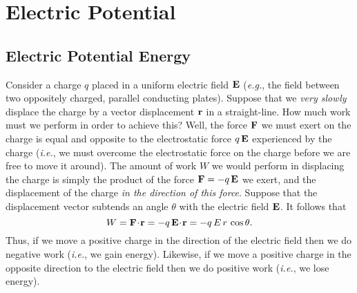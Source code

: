 \section{Electric Potential}\label{spotn}
\subsection{Electric Potential Energy}\label{s3.1}
Consider a charge $q$ placed in a uniform electric field
${\bf E}$ ({\em e.g.}, the field between two oppositely charged, parallel
conducting plates). Suppose that we {\em very slowly}\/ displace the charge by a vector displacement ${\bf r}$ in a straight-line. How much work must we perform
in order to achieve this? Well, the force ${\bf F}$ we must exert on the charge is
equal and opposite to the electrostatic force $q\,{\bf E}$ experienced by the charge
({\em i.e.}, we must overcome the electrostatic force on the charge before we are
free to move it around). 
The amount of work $W$ we would perform in displacing the charge is simply the product of the force  ${\bf F}=-
q\,{\bf E}$ we
exert, and the displacement of the charge {\em in the direction of this force}.
Suppose  that the displacement vector subtends an angle $\theta$ with
the electric field ${\bf E}$. It follows that
\begin{equation}\label{e5.1}
W = {\bf F} \!\cdot\! {\bf  r} = -q\,{\bf E}\!\cdot\! {\bf r} = -q\, E \,r\,
\cos\theta.
\end{equation}
Thus, if we move a positive charge in the direction of the electric field then we
do negative work ({\em i.e.}, we gain energy). Likewise,
if we move a positive charge in the opposite direction to the electric field
then we do positive work ({\em i.e.}, we lose energy). 


